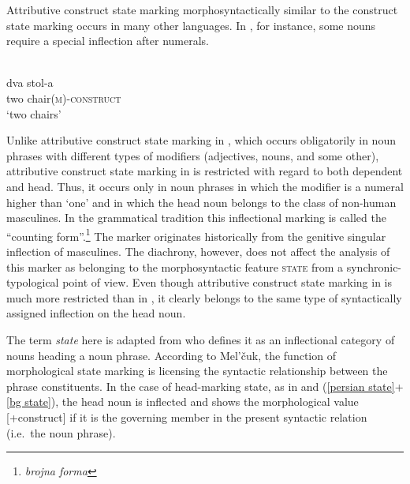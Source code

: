 Attributive construct state marking morphosyntactically similar to the  construct state marking occurs in many other languages. In , for instance, some nouns require a special inflection after numerals.
\begin{exe}
\ex 
{}\\
\label{bg state}
\gll 	dva 	stol-a\\
	two	chair{\textsc{(m)-construct}}\\
\glt 	‘two chairs’
\end{exe}
Unlike attributive construct state marking in , which occurs obligatorily in noun phrases with different types of modifiers (adjectives, nouns, and some other), attributive construct state marking in  is restricted with regard to both dependent and head. Thus, it occurs only in noun phrases in which the modifier is a numeral higher than ‘one’ and in which the head noun belongs to the class of non-human masculines. In the  grammatical tradition this inflectional marking is called the “counting form”.\footnote{ \emph{brojna forma}} The marker originates historically from the genitive singular inflection of masculines. The diachrony, however, does not affect the analysis of this marker as belonging to the morphosyntactic feature \textsc{state} from a synchronic-typological point of view. Even though attributive construct state marking in  is much more restricted than in , it clearly belongs to the same type of syntactically assigned inflection on the head noun.

The term \emph{state} here is adapted from \textcite[114–116]{melcuk2006} who defines it as an inflectional category of nouns heading a noun phrase. According to Mel'čuk, the function of morphological state marking is licensing the syntactic relationship between the phrase constituents. In the case of head-marking state, as in  and  (\ref{persian state}+\ref{bg state}), the head noun is inflected and shows the morphological value [+construct] if it is the governing member in the present syntactic relation (i.e.~the noun phrase). 

